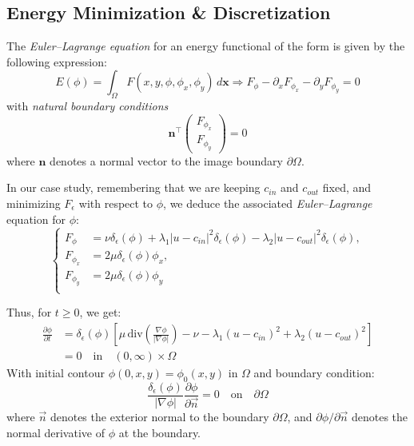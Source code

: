 \documentclass[journal]{IEEEtran}
\begin{document}
\subsection{Energy Minimization \& Discretization}
The \emph{Euler--Lagrange equation} for an energy functional of the form is given by the following expression:
\[
    E(\phi) = \int_{\Omega} F(x, y, \phi, \phi_x, \phi_y) \, d\bm{x} \Longrightarrow F_\phi - \partial_x F_{\phi_x} - \partial_y F_{\phi_y} = 0
\]
with \textit{natural boundary conditions}
\[
    \bm{n}^\top \left( \begin{array}{c}
            F_{\phi_x} \\
            F_{\phi_y}
        \end{array} \right) = 0
\]
where $\bm{n}$ denotes a normal vector to the image boundary $\partial \Omega$.

In our case study, remembering that we are keeping $c_{in}$ and $c_{out}$ fixed, and minimizing $F_{\epsilon}$ with respect to $\phi$, we deduce the associated \emph{Euler--Lagrange} equation for $\phi$:
\[
    \begin{cases}
        F_\phi     & = \nu \delta_\epsilon(\phi) + \lambda_1 |u - c_{in}|^2 \delta_\epsilon(\phi) - \lambda_2 |u - c_{out}|^2 \delta_\epsilon(\phi), \\
        F_{\phi_x} & = 2 \mu \delta_\epsilon(\phi) \phi_x,                                                                                           \\
        F_{\phi_y} & = 2 \mu \delta_\epsilon(\phi) \phi_y                                                                                            \\
    \end{cases}
\]
\vspace{-0.5\baselineskip}

Thus, for $t \geq 0$, we get:
\begin{equation}\label{eq:phi-pde}
    \begin{aligned}
        \frac{\partial \phi}{\partial t} & = \delta_{\epsilon}(\phi) \left[ \mu \, \textrm{div} \left( \frac{\nabla \phi}{|\nabla \phi|} \right) - \nu - \lambda_1 (u - c_{in})^2 + \lambda_2 (u - c_{out})^2 \right] \\
                                         & = 0 \quad \textrm{in} \quad (0, \infty) \times \Omega
    \end{aligned}
\end{equation}
With initial contour $\phi(0, x, y) = \phi_0(x, y) \, \, \textrm{in} \, \, \Omega$ and boundary condition:
\begin{equation}\label{eq:boundary-condition}
    \frac{\delta_{\epsilon}(\phi)}{|\nabla \phi|} \frac{\partial \phi}{\partial \vec{n}} = 0 \quad \textrm{on} \quad \partial \Omega
\end{equation}
where $\vec{n}$ denotes the exterior normal to the boundary $\partial \Omega$, and $\partial \phi / \partial \vec{n}$ denotes the normal derivative of $\phi$ at the boundary.
\end{document}
